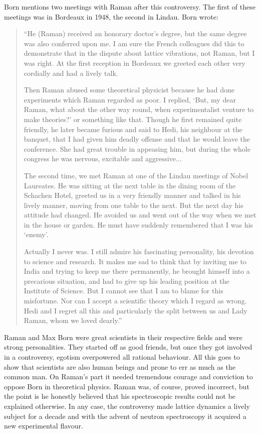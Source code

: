 Born mentions two meetings with Raman after this controversy. The first of these meetings was in Bordeaux in 1948, the second in Lindau. Born wrote:
\begin{quote}
{\fontsize{10pt}{12pt}\selectfont
``He (Raman) received an honorary doctor's degree, but the same degree was also conferred upon me. I am sure the French colleagues did this to demonstrate that in the dispute about lattice vibrations, not Raman, but I was right. At the first reception in Bordeaux we greeted each other very cordially and had a lively talk. 

Then Raman abused some theoretical physicist because he had done experiments which Raman regarded as poor. I replied, `But, my dear Raman, what about the other way round, when experimentalist venture to make theories?' or something like that. Though he first remained quite friendly, he later became furious and said to Hedi, his neighbour at the banquet, that I had given him deadly offense and that he would leave the conference. She had great trouble in appeasing him, but during the whole congress he was nervous, excitable and aggressive...

The second time, we met Raman at one of the Lindau meetings of Nobel Laureates. He was sitting at the next table in the dining room of the Schachen Hotel, greeted us in a very friendly manner and talked in his lively manner, moving from one table to the next. But the next day his attitude had changed. He avoided us and went out of the way when we met in the house or garden. He must have suddenly remembered that I was his `enemy'.

\newpage

Actually I never was. I still admire his fascinating personality, his devotion to science and research. It makes me sad to think that by inviting me to India and trying to keep me there permanently, he brought himself into a precarious situation, and had to give up his leading position at the Institute of Science. But I cannot see that I am to blame for this misfortune. Nor can I accept a scientific theory which I regard as wrong. Hedi and I regret all this and particularly the split between us and Lady Raman, whom we loved dearly.''}\relax
\end{quote}

Raman and Max Born were great scientists in their respective fields and were strong personalities. They started off as good friends, but once they got involved in a controversy, egotism overpowered all rational behaviour. All this goes to show that scientists are also human beings and prone to err as much as the common man. On Raman's part it needed tremendous courage and conviction to oppose Born in theoretical physics. Raman was, of course, proved incorrect, but the point is he honestly believed that his spectroscopic results could not be explained otherwise. In any case, the controversy made lattice dynamics a lively subject for a decade and with the advent of neutron spectroscopy it acquired a new experimental flavour.


